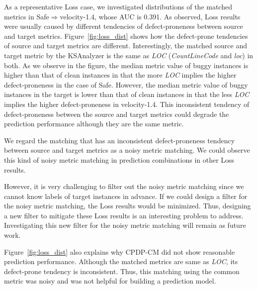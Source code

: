 As a representative Loss case, we investigated distributions of the matched metrics in Safe$\Rightarrow$velocity-1.4, whose AUC is 0.391.
As observed, Loss results were usually caused by different tendencies of
defect-proneness between source and target metrics. Figure~\ref{fig:loss_dist}
shows how the defect-prone tendencies of source and target metrics are different.
Interestingly, the matched source and target metric by the KSAnalyzer is the
same as {\em LOC} ({\em CountLineCode} and {\em loc}) in both.
As we observe in the figure, the median metric value of buggy instances is higher than that of clean instances in that the more {\em LOC}
implies the higher defect-proneness in the case of Safe. However, the median metric value of
buggy instances in the target is lower than that of clean instances
in that the less {\em LOC} implies the higher defect-proneness in
velocity-1.4. This inconsistent tendency of
defect-proneness between the source and target metrics could degrade the
prediction performance although they are the same metric.

We regard the matching that has an inconsistent defect-proneness tendency between
source and target metrics as a noisy metric matching.
We could observe this kind of noisy metric matching in
prediction combinations in other Loss results.

However, it is very challenging to filter out the noisy metric matching since we
cannot know labels of target instances in
advance. If we could design a filter for the noisy metric matching, the Loss
results would be minimized. Thus, designing a new filter to mitigate these Loss
results is an interesting problem to address. Investigating this new filter
for the noisy metric matching will remain as future work.

Figure~\ref{fig:loss_dist} also explains why CPDP-CM did not show reasonable
prediction performance. Although the matched metrics are same
as {\em LOC}, its defect-prone tendency is inconsistent. Thus, this matching using
the common metric was noisy and was not helpful for building a prediction model.




